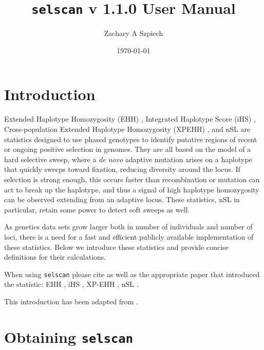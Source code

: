 \documentclass[12pt]{article}%
\title{{\tt selscan} v 1.1.0 User Manual}
\date{\today}
\author{Zachary A Szpiech}
\begin{document}
\lstset{breaklines=true,basicstyle=\ttfamily}

\null  %
\nointerlineskip  %
\vfill
\let\snewpage \newpage
\let\newpage \relax
\maketitle
\thispagestyle{empty}
\let \newpage \snewpage
\vfill 
\break %

\tableofcontents 

\newpage

\section{Introduction}

Extended Haplotype Homozygosity (EHH) \cite[]{SabetiEtAl02}, Integrated Haplotype 
Score (iHS) \cite[]{VoightEtAl06}, Cross-population Extended Haplotype 
Homozygosity (XPEHH) \cite[]{SabetiEtAl07}, and nSL \cite[]{FerrerAdmetllaEtAl14} are statistics designed to use phased genotypes to identify putative regions
of recent or ongoing positive selection in genomes.  They are all based on the model of 
a hard selective sweep, where a {\it de novo} adaptive mutation arises on a haplotype
that quickly sweeps toward fixation, reducing diversity around the locus.  If selection is strong enough, this occurs
faster than recombination or mutation can act to break up the haplotype, and thus a signal of high 
haplotype homozygosity can be observed extending from an adaptive locus.  These statistics, nSL in particular, retain some power to detect soft sweeps as well.

As genetics data sets grow larger both in number of individuals and number of loci,
there is a need for a fast and efficient publicly available implementation of these statistics. Below we 
introduce these statistics and provide concise definitions for their calculations.  

When using {\tt selscan} please cite \cite{SzpiechAndHernandez14} as well as the appropriate paper that introduced the statistic: EHH \cite[]{SabetiEtAl02}, iHS \cite[]{VoightEtAl06}, XP-EHH \cite[]{SabetiEtAl07}, nSL \cite[]{FerrerAdmetllaEtAl14}.

This introduction has been adapted from \cite{SzpiechAndHernandez14}.

\section{Obtaining {\tt selscan}}
\end{document}
